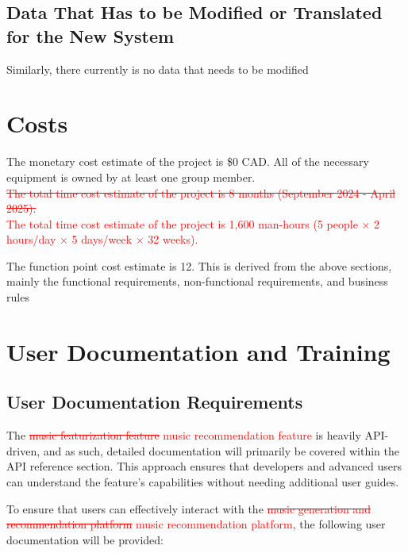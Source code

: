 \documentclass[12pt]{article}
\begin{document}
\subsection{Data That Has to be Modified or Translated for the New System}
Similarly, there currently is no data that needs to be modified

\section{Costs}
The monetary cost estimate of the project is \$0 CAD. All of the necessary equipment is
owned by at least one group member.\\

\noindent
\textcolor{red}{\sout{The total time cost estimate of the project is 8 months (September 2024 - April 2025).}}\\
\textcolor{red}{The total time cost estimate of the project is 1,600 man-hours (5 people × 2 hours/day × 5 days/week × 32 weeks).}


\noindent
The function point cost estimate is 12. This is derived from the above sections, mainly the functional
requirements, non-functional requirements, and business rules
\section{User Documentation and Training}

\subsection{User Documentation Requirements}

The \textcolor{red}{\sout{music featurization feature}} \textcolor{red}{music recommendation feature} is heavily API-driven, and as such, detailed documentation will primarily be covered within the API reference section. This approach ensures that developers and advanced users can understand the feature's capabilities without needing additional user guides.

To ensure that users can effectively interact with the \textcolor{red}{\sout{music generation and recommendation platform}} \textcolor{red}{music recommendation platform}, the following user documentation will be provided:
\end{document}
